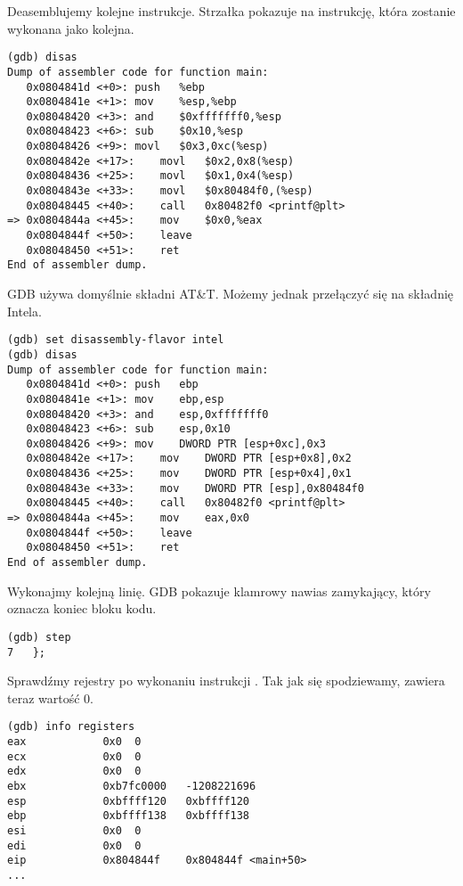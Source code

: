 Deasemblujemy kolejne instrukcje.
Strzałka pokazuje na instrukcję, która zostanie wykonana jako kolejna.

\begin{lstlisting}[style=customasmx86]
(gdb) disas
Dump of assembler code for function main:
   0x0804841d <+0>:	push   %ebp
   0x0804841e <+1>:	mov    %esp,%ebp
   0x08048420 <+3>:	and    $0xfffffff0,%esp
   0x08048423 <+6>:	sub    $0x10,%esp
   0x08048426 <+9>:	movl   $0x3,0xc(%esp)
   0x0804842e <+17>:	movl   $0x2,0x8(%esp)
   0x08048436 <+25>:	movl   $0x1,0x4(%esp)
   0x0804843e <+33>:	movl   $0x80484f0,(%esp)
   0x08048445 <+40>:	call   0x80482f0 <printf@plt>
=> 0x0804844a <+45>:	mov    $0x0,%eax
   0x0804844f <+50>:	leave
   0x08048450 <+51>:	ret
End of assembler dump.
\end{lstlisting}

\ac{GDB} używa domyślnie składni AT\&T.
Możemy jednak przełączyć się na składnię Intela.

\begin{lstlisting}[style=customasmx86]
(gdb) set disassembly-flavor intel
(gdb) disas
Dump of assembler code for function main:
   0x0804841d <+0>:	push   ebp
   0x0804841e <+1>:	mov    ebp,esp
   0x08048420 <+3>:	and    esp,0xfffffff0
   0x08048423 <+6>:	sub    esp,0x10
   0x08048426 <+9>:	mov    DWORD PTR [esp+0xc],0x3
   0x0804842e <+17>:	mov    DWORD PTR [esp+0x8],0x2
   0x08048436 <+25>:	mov    DWORD PTR [esp+0x4],0x1
   0x0804843e <+33>:	mov    DWORD PTR [esp],0x80484f0
   0x08048445 <+40>:	call   0x80482f0 <printf@plt>
=> 0x0804844a <+45>:	mov    eax,0x0
   0x0804844f <+50>:	leave
   0x08048450 <+51>:	ret
End of assembler dump.
\end{lstlisting}

Wykonajmy kolejną linię.
\ac{GDB} pokazuje klamrowy nawias zamykający, który oznacza koniec bloku kodu.

\begin{lstlisting}
(gdb) step
7	};
\end{lstlisting}

Sprawdźmy rejestry po wykonaniu instrukcji . Tak jak się spodziewamy, \EAX zawiera teraz wartość 0.

\begin{lstlisting}
(gdb) info registers
eax            0x0	0
ecx            0x0	0
edx            0x0	0
ebx            0xb7fc0000	-1208221696
esp            0xbffff120	0xbffff120
ebp            0xbffff138	0xbffff138
esi            0x0	0
edi            0x0	0
eip            0x804844f	0x804844f <main+50>
...
\end{lstlisting}
